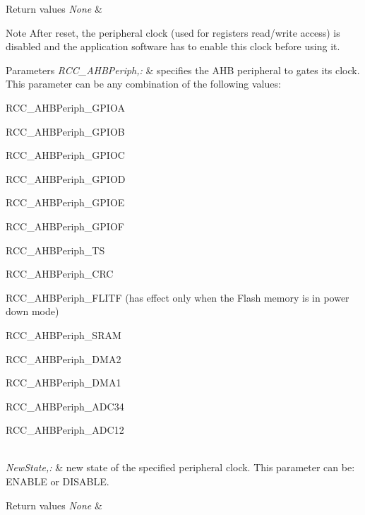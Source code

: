 \begin{DoxyRetVals}{Return values}
{\em None} & \\
\hline
\end{DoxyRetVals}
\begin{DoxyNote}{Note}
After reset, the peripheral clock (used for registers read/write access) is disabled and the application software has to enable this clock before using it. 
\end{DoxyNote}

\begin{DoxyParams}{Parameters}
{\em R\-C\-C\-\_\-\-A\-H\-B\-Periph,\-:} & specifies the A\-H\-B peripheral to gates its clock. This parameter can be any combination of the following values\-: \begin{DoxyItemize}
\item R\-C\-C\-\_\-\-A\-H\-B\-Periph\-\_\-\-G\-P\-I\-O\-A \item R\-C\-C\-\_\-\-A\-H\-B\-Periph\-\_\-\-G\-P\-I\-O\-B \item R\-C\-C\-\_\-\-A\-H\-B\-Periph\-\_\-\-G\-P\-I\-O\-C \item R\-C\-C\-\_\-\-A\-H\-B\-Periph\-\_\-\-G\-P\-I\-O\-D \item R\-C\-C\-\_\-\-A\-H\-B\-Periph\-\_\-\-G\-P\-I\-O\-E \item R\-C\-C\-\_\-\-A\-H\-B\-Periph\-\_\-\-G\-P\-I\-O\-F \item R\-C\-C\-\_\-\-A\-H\-B\-Periph\-\_\-\-T\-S \item R\-C\-C\-\_\-\-A\-H\-B\-Periph\-\_\-\-C\-R\-C \item R\-C\-C\-\_\-\-A\-H\-B\-Periph\-\_\-\-F\-L\-I\-T\-F (has effect only when the Flash memory is in power down mode) \item R\-C\-C\-\_\-\-A\-H\-B\-Periph\-\_\-\-S\-R\-A\-M \item R\-C\-C\-\_\-\-A\-H\-B\-Periph\-\_\-\-D\-M\-A2 \item R\-C\-C\-\_\-\-A\-H\-B\-Periph\-\_\-\-D\-M\-A1 \item R\-C\-C\-\_\-\-A\-H\-B\-Periph\-\_\-\-A\-D\-C34 \item R\-C\-C\-\_\-\-A\-H\-B\-Periph\-\_\-\-A\-D\-C12 \end{DoxyItemize}
\\
\hline
{\em New\-State,\-:} & new state of the specified peripheral clock. This parameter can be\-: E\-N\-A\-B\-L\-E or D\-I\-S\-A\-B\-L\-E. \\
\hline
\end{DoxyParams}

\begin{DoxyRetVals}{Return values}
{\em None} & \\
\hline
\end{DoxyRetVals}


